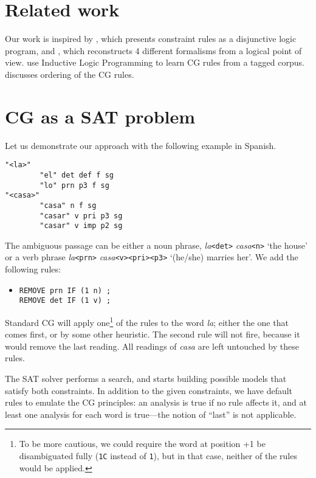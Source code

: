 \documentclass[11pt]{article}
\begin{document}
\section{Related work}
\label{sect:related}

Our work is inspired by \cite{lager98}, which presents constraint rules as a disjunctive logic program,
and \cite{lager_nivre01}, which reconstructs 4 different formalisms from a logical point of view.
\cite{lindberg_eineborg98ilp,asfrent14} use Inductive Logic Programming to learn CG rules from a tagged corpus.
\cite{lager01transformation} discusses ordering of the CG rules.

\section{CG as a SAT problem}
Let us demonstrate our approach with the following example in Spanish.

\begin{verbatim}
"<la>"
        "el" det def f sg
        "lo" prn p3 f sg
"<casa>"
        "casa" n f sg
        "casar" v pri p3 sg
        "casar" v imp p2 sg
\end{verbatim}

The ambiguous passage can be either a noun phrase, \emph{la}\texttt{<det>} \emph{casa}\texttt{<n>} 
`the house'  or a verb phrase \emph{la}\texttt{<prn>}  \emph{casa}\texttt{<v><pri><p3>} `(he/she) marries her'. 
We add the following rules:

\begin{itemize}
\item [] \texttt{REMOVE prn IF (1 n) ;} \\
             \texttt{REMOVE det IF (1 v) ;}
\end{itemize}

Standard CG will apply one\footnote{To be more cautious, we could require the word at position +1 be disambiguated fully (\texttt{1C} instead of \texttt{1}), but in that case, 
neither of the rules would be applied.} of the rules to the word \emph{la}; 
either the one that comes first, or by some other heuristic. 
The second rule will not fire, because it would remove the last reading. 
All readings of \emph{casa} are left untouched by these rules.

The SAT solver performs a search, 
and starts building possible models that satisfy both constraints. 
In addition to the given constraints, we have default rules to emulate
the CG principles: an analysis is true if no rule affects it,
and at least one analysis for each word is true---the notion of
``last'' is not applicable.
\end{document}
